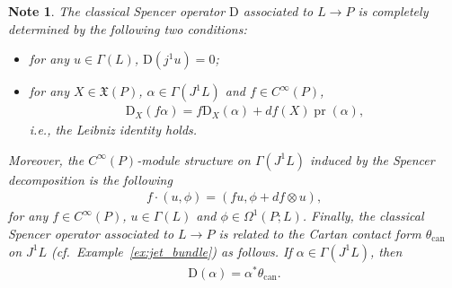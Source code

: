 \documentclass[10pt,a4paper]{amsart}
\numberwithin{equation}{section}
\newtheorem{Note}[Theorem]{Note}
\newcommand{\X}{\ensuremath{\mathfrak{X}}}
\begin{document}
\begin{Note}\label{obs:prop_cso}
The classical Spencer operator $\mathrm{D}$ associated to $L \to P$ is completely determined by the following two conditions:
 \begin{itemize}\itemsep=0pt
 \item for any $u \in \Gamma(L)$, $\mathrm{D}(j^1u)=0$;
 \item for any $X \in \X(P)$, $\alpha \in \Gamma(J^1L)$ and $f \in C^{\infty}(P)$,
 \begin{gather*}\mathrm{D}_X(f\alpha)=f\mathrm{D}_X(\alpha)+df(X)\operatorname{pr}(\alpha),\end{gather*}
 i.e., the Leibniz identity holds.
 \end{itemize}
Moreover, the $C^{\infty}(P)$-module structure on $\Gamma(J^1L) $ induced by the Spencer decomposition is the following
 \begin{gather*} f\cdot (u, \phi)= (f u, \phi+ df\otimes u),\end{gather*}
for any $f \in C^{\infty}(P)$, $u \in \Gamma(L)$ and $\phi \in \Omega^1(P;L)$. Finally, the classical Spencer operator associated to $L \to P$ is related to the Cartan contact form $\theta_{\mathrm{can}}$ on $J^1L$ (cf.\ Example~\ref{ex:jet_bundle}) as follows. If $\alpha \in \Gamma (J^1L )$, then
\begin{gather*}
\mathrm{D}(\alpha) = \alpha^* \theta_{\mathrm{can}}.
\end{gather*}
\end{Note}
\end{document}

